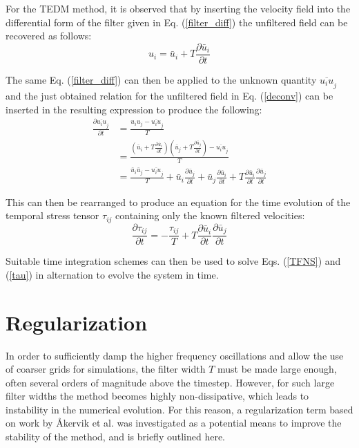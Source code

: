 For the TEDM method, it is observed that by inserting the velocity field into the differential form of the filter given in Eq. (\ref{filter_diff}) the unfiltered field can be recovered as follows:
\begin{equation} \label{deconv}
u_i=\bar{u}_i+T\frac{\partial \bar{u}_i}{\partial t}
\end{equation}

The same Eq. (\ref{filter_diff}) can then be applied to the unknown quantity $\overline{u_i u}_j$ and the just obtained relation for the unfiltered field in Eq. (\ref{deconv}) can be inserted in the resulting expression to produce the following:
\begin{equation}
\begin{split}
\frac{\partial{\overline{u_i u}_j}}{\partial t}&=\frac{u_i u_j-\overline{u_i u}_j}{T} \\
&=\frac{\left( \bar{u}_i+T\frac{\partial \bar{u}_i}{\partial t} \right) \left( \bar{u}_j+T\frac{\partial \bar{u}_j}{\partial t} \right)-\overline{u_i u}_j}{T} \\
&=\frac{\bar{u}_i \bar{u}_j-\overline{u_i u}_j}{T}+\bar{u}_i\frac{\partial \bar{u}_j}{\partial t}+\bar{u}_j\frac{\partial \bar{u}_i}{\partial t}+T\frac{\partial \bar{u}_i}{\partial t}\frac{\partial \bar{u}_j}{\partial t}
\end{split}
\end{equation}

This can then be rearranged to produce an equation for the time evolution of the temporal stress tensor $\tau_{ij}$ containing only the known filtered velocities:
\begin{equation} \label{tau}
\frac{\partial \tau_{ij}}{\partial t}=-\frac{\tau_{ij}}{T}+T\frac{\partial \bar{u}_i}{\partial t}\frac{\partial \bar{u}_j}{\partial t}
\end{equation}

Suitable time integration schemes can then be used to solve Eqs. (\ref{TFNS}) and (\ref{tau}) in alternation to evolve the system in time.

\section{Regularization} \label{sec:Reg}

In order to sufficiently damp the higher frequency oscillations and allow the use of coarser grids for simulations, the filter width $T$ must be made large enough, often several orders of magnitude above the timestep. However, for such large filter widths the method becomes highly non-dissipative, which leads to instability in the numerical evolution. For this reason, a regularization term based on work by \AA kervik et al. \cite{Akervik2006} was investigated as a potential means to improve the stability of the method, and is briefly outlined here.

